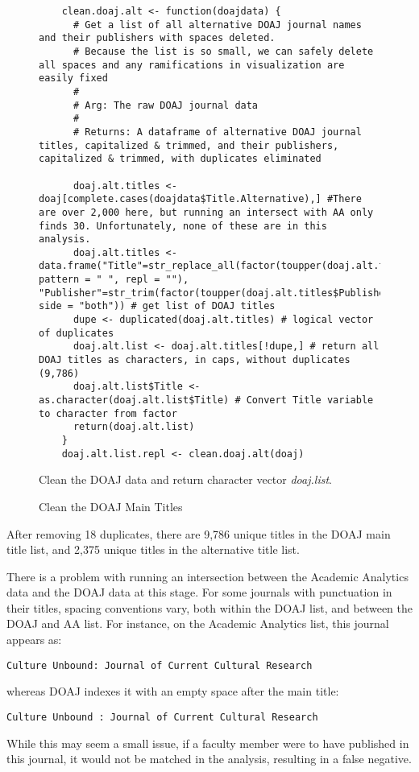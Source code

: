 \documentclass{article}
\begin{document}
\begin{figure}[hb]
	\centering
	\caption{Clean the DOAJ Main Titles}
	\begin{lstlisting}
	clean.doaj.alt <- function(doajdata) {
	  # Get a list of all alternative DOAJ journal names and their publishers with spaces deleted.
	  # Because the list is so small, we can safely delete all spaces and any ramifications in visualization are easily fixed
	  #
	  # Arg: The raw DOAJ journal data
	  #
	  # Returns: A dataframe of alternative DOAJ journal titles, capitalized & trimmed, and their publishers, capitalized & trimmed, with duplicates eliminated
	  
	  doaj.alt.titles <- doaj[complete.cases(doajdata$Title.Alternative),] #There are over 2,000 here, but running an intersect with AA only finds 30. Unfortunately, none of these are in this analysis.
	  doaj.alt.titles <- data.frame("Title"=str_replace_all(factor(toupper(doaj.alt.titles$Title.Alternative)), pattern = " ", repl = ""), "Publisher"=str_trim(factor(toupper(doaj.alt.titles$Publisher)), side = "both")) # get list of DOAJ titles
	  dupe <- duplicated(doaj.alt.titles) # logical vector of duplicates
	  doaj.alt.list <- doaj.alt.titles[!dupe,] # return all DOAJ titles as characters, in caps, without duplicates (9,786)
	  doaj.alt.list$Title <- as.character(doaj.alt.list$Title) # Convert Title variable to character from factor
	  return(doaj.alt.list)
	}
	doaj.alt.list.repl <- clean.doaj.alt(doaj)
	\end{lstlisting}
	\footnotesize{
		Clean the DOAJ data and return character vector \textit{doaj.list}.
			}
\end{figure}





After removing 18 duplicates, there are 9,786 unique titles in the DOAJ main title list, and 2,375 unique titles in the alternative title list.

There is a problem with running an intersection between the Academic Analytics data and the DOAJ data at this stage.
For some journals with punctuation in their titles, spacing conventions vary, both within the DOAJ list, and between the DOAJ and AA list.
For instance, on the Academic Analytics list, this journal appears as: {\large \begin{verbatim}Culture Unbound: Journal of Current Cultural Research\end{verbatim}} whereas DOAJ indexes it with an empty space after the main title: {\large \begin{verbatim}Culture Unbound : Journal of Current Cultural Research\end{verbatim}}
While this may seem a small issue, if a faculty member were to have published in this journal, it would not be matched in the analysis, resulting in a false negative.
\end{document}
